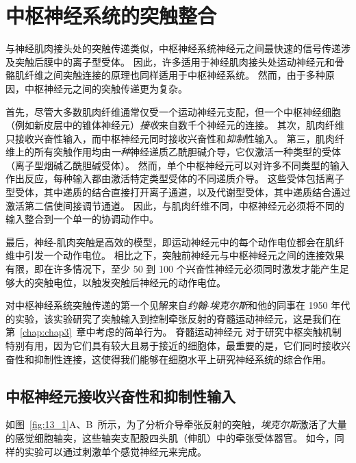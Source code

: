 \chapter{中枢神经系统的突触整合} \label{chap:chap13}

与神经肌肉接头处的突触传递类似，中枢神经系统神经元之间最快速的信号传递涉及突触后膜中的离子型受体。
因此，许多适用于神经肌肉接头处运动神经元和骨骼肌纤维之间突触连接的原理也同样适用于中枢神经系统。
然而，由于多种原因，中枢神经元之间的突触传递更为复杂。


首先，尽管大多数肌肉纤维通常仅受一个运动神经元支配，但一个中枢神经细胞（例如新皮层中的锥体神经元）\textit{接收}来自数千个神经元的连接。
其次，肌肉纤维只接收兴奋性输入，而中枢神经元同时接收兴奋性和\textit{抑制}性输入。
第三，肌肉纤维上的所有突触作用均由\textit{一种}神经递质乙酰胆碱介导，它仅激活一种类型的受体（离子型烟碱乙酰胆碱受体）。
然而，单个中枢神经元可以对许多不同类型的输入作出反应，每种输入都由激活特定类型受体的不同递质介导。
这些受体包括离子型受体，其中递质的结合直接打开离子通道，以及代谢型受体，其中递质结合通过激活第二信使间接调节通道。
因此，与肌肉纤维不同，中枢神经元必须将不同的输入整合到一个单一的协调动作中。


最后，神经-肌肉突触是高效的模型，即运动神经元中的每个动作电位都会在肌纤维中引发一个动作电位。
相比之下，突触前神经元与中枢神经元之间的连接效果有限，即在许多情况下，至少 50 到 100 个兴奋性神经元必须同时激发才能产生足够大的突触电位，以触发突触后神经元的动作电位。


对中枢神经系统突触传递的第一个见解来自\textit{约翰$\cdot$埃克尔斯}和他的同事在 1950 年代的实验，该实验研究了突触输入到控制牵张反射的脊髓运动神经元，这是我们在第~\ref{chap:chap3}~章中考虑的简单行为。
脊髓运动神经元 对于研究中枢突触机制特别有用，因为它们具有较大且易于接近的细胞体，最重要的是，它们同时接收兴奋性和抑制性连接，这使得我们能够在细胞水平上研究神经系统的综合作用。



\section{中枢神经元接收兴奋性和抑制性输入}

如图~\ref{fig:13_1}A、B~所示，为了分析介导牵张反射的突触，\textit{埃克尔斯}激活了大量的感觉细胞轴突，这些轴突支配股四头肌（伸肌）中的牵张受体器官。
如今，同样的实验可以通过刺激单个感觉神经元来完成。


